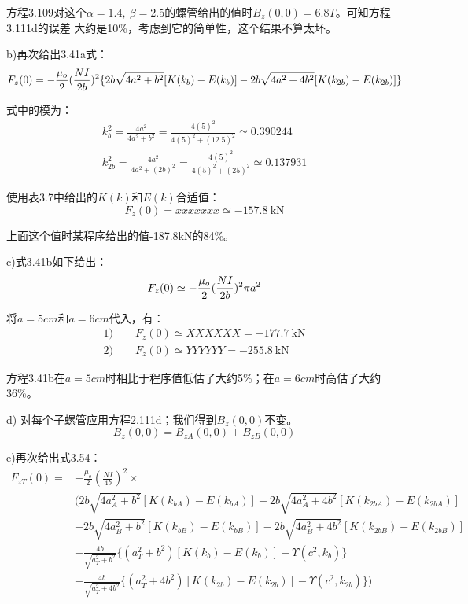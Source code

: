 方程3.109对这个$\alpha=1.4,\ \beta=2.5$的螺管给出的值时$B_z(0,0) = 6.8 T$。可知方程3.111d的误差
大约是10\%，考虑到它的简单性，这个结果不算太坏。

b)再次给出3.41a式：
\begin{equation}
F_{z}(0)=-\frac{\mu_{o}}{2}(\frac{NI}{2b})^{2}\{2b\sqrt{4a^{2}+b^{2}}[K(k_{b})-E(k_{b})]\\
-2b\sqrt{4a^{2}+4b^{2}}[K(k_{2b})-E(k_{2b})]\}\\%
\end{equation}

式中的模为：
\begin{eqnarray}
k_b^2=\frac{4a^2}{4a^2+b^2}=\frac{4(5)^2}{4(5)^2+(12.5)^2}\simeq 0.390244\\
k_{2b}^2=\frac{4a^2}{4a^2+(2b)^2}=\frac{4(5)^2}{4(5)^2+(25)^2}\simeq 0.137931
\end{eqnarray}

使用表3.7中给出的$K(k)$和$E(k)$合适值：
\begin{equation*}
F_z(0)= xxxxxxx \simeq -157.8\ \mathrm{kN}
\end{equation*}

上面这个值时某程序给出的值-187.8kN的84\%。

c)式3.41b如下给出：
\begin{equation}
F_{z}(0)\simeq-\frac{\mu_{o}}{2}(\frac{NI}{2b})^{2}\pi a^{2}\\%
\end{equation}

将$a=5 cm$和$a=6 cm$代入，有：
\begin{eqnarray}
1)\qquad F_z(0)\simeq XXXXXX =-177.7\ \mathrm{kN}\\
2)\qquad F_z(0)\simeq YYYYYY = -255.8\ \mathrm{kN}
\end{eqnarray}

方程3.41b在$a=5 cm$时相比于程序值低估了大约5\%；在$a=6 cm$时高估了大约36\%。

d) 对每个子螺管应用方程2.111d；我们得到$B_z(0,0)$不变。
$$B_z(0,0) = B_{zA}(0,0) + B_{zB}(0,0)$$

e)再次给出式3.54：
\begin{equation}
\begin{split}
F_{zT}(0)=&-\frac{\mu_{o}}{2}(\frac{NI}{4b})^{2}\times\\
&(2b\sqrt{4a_{A}^{2}+b^{2}}[K(k_{bA})-E(k_{bA})]-2b\sqrt{4a_{A}^{2}+4b^{2}}[K(k_{2bA})-E(k_{2bA})]\\
&+2b\sqrt{4a_{B}^{2}+b^{2}}[K(k_{bB})-E(k_{bB})]-2b\sqrt{4a_{B}^{2}+4b^{2}}[K(k_{2bB})-E(k_{2bB})]\\
&-\frac{4b}{\sqrt{a_{T}^{2}+b^{2}}}\{(a_{T}^{2}+b^{2})[K(k_{b})-E(k_{b})]-\Upsilon(c^{2},k_{b})\}\\
&+\frac{4b}{\sqrt{a_{T}^{2}+4b^{2}}}\{(a_{T}^{2}+4b^{2})[K(k_{2b})-E(k_{2b})]-\Upsilon(c^{2},k_{2b})\})%
\end{split}
\end{equation}

